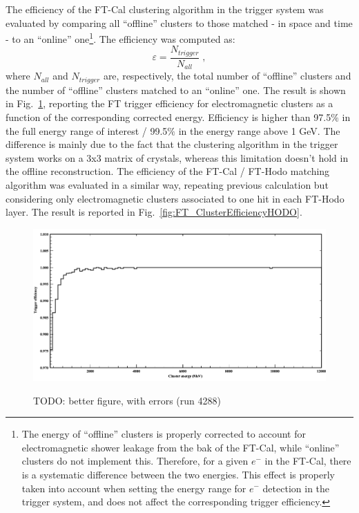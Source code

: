 The efficiency of the FT-Cal clustering algorithm in the trigger system was evaluated by comparing all ``offline'' clusters to those matched - in space and time - to an ``online'' one\footnote{The energy of ``offline'' clusters is properly corrected to account for electromagnetic shower leakage from the bak of the FT-Cal, while ``online'' clusters do not implement this. Therefore, for a given $e^-$ in the FT-Cal, there is a systematic difference between the two energies. This effect is properly taken into account when setting the energy range for $e^-$ detection in the trigger system, and does not affect the corresponding trigger efficiency.}. The efficiency was computed as:
\begin{equation}
\varepsilon=\frac{N_{trigger}}{N_{all}} \; ,
\end{equation}
where $N_{all}$ and $N_{trigger}$ are, respectively, the total number of ``offline'' clusters and the number of ``offline'' clusters matched to an ``online'' one.
The result is shown in Fig.~\ref{fig:FT_ClusterEfficiency}, reporting the FT trigger efficiency for electromagnetic clusters as a function of the corresponding corrected energy. Efficiency is higher than 97.5$\%$ in the full energy range of interest / 99.5$\%$ in the energy range above 1 GeV. The difference is mainly due to the fact that the clustering algorithm in the trigger system works on a 3x3 matrix of crystals, whereas this limitation doesn't hold in the offline reconstruction.
The efficiency of the FT-Cal / FT-Hodo matching algorithm was evaluated in a similar way, repeating previous calculation but considering only electromagnetic clusters associated to one hit in each FT-Hodo layer. The result is reported in Fig.~\ref{fig:FT_ClusterEfficiencyHODO}.

\begin{figure}[!htb]
 \centering
{\includegraphics[width=.5\textwidth]{img/FT_ClusterEfficiency.png}}
 \caption{TODO: better figure, with errors (run 4288)}
 \label{fig:FT_ClusterEfficiency}
\end{figure}




